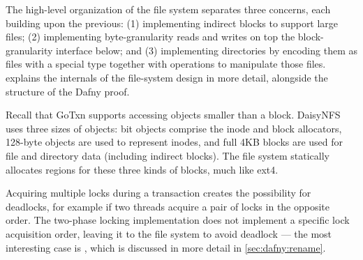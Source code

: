 The high-level organization of the file system separates three concerns, each
building upon the previous: (1) implementing indirect blocks to support large
files; (2) implementing byte-granularity
reads and writes on top the block-granularity interface below; and (3) implementing
directories by encoding them as files with a special type together with
operations to manipulate those files.  explains the
internals of the file-system design in more detail, alongside the structure of
the Dafny proof.


Recall that GoTxn supports accessing objects smaller than a block. DaisyNFS uses
three sizes of objects: bit objects comprise the inode and block allocators,
128-byte objects are used to represent inodes, and full 4KB blocks are used for
file and directory data (including indirect blocks). The file system statically
allocates regions for these three kinds of blocks, much like ext4.

Acquiring multiple locks during a transaction creates the possibility
for deadlocks, for example if two threads acquire a pair of locks in the opposite
order. The two-phase locking implementation does not implement a
specific lock acquisition order, leaving it to the file system to
avoid deadlock --- the most interesting case is , which is discussed
in more detail in \cref{sec:dafny:rename}.

